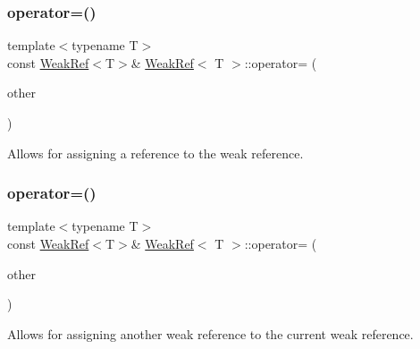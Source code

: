\mbox{\label{class_weak_ref_a1ea1d08432dd8646f6c085fc93477e75}} 
\subsubsection{\texorpdfstring{operator=()}{operator=()}\hspace{0.1cm}{\footnotesize\ttfamily [1/2]}}
{\footnotesize\ttfamily template$<$typename T$>$ \\
const \mbox{\hyperlink{class_weak_ref}{Weak\+Ref}}$<$T$>$\& \mbox{\hyperlink{class_weak_ref}{Weak\+Ref}}$<$ T $>$\+::operator= (\begin{DoxyParamCaption}\item[{const \mbox{\hyperlink{class_ref}{Ref}}$<$ T $>$ \&}]{other }\end{DoxyParamCaption})\hspace{0.3cm}{\ttfamily [inline]}}



Allows for assigning a reference to the weak reference. 

\mbox{\label{class_weak_ref_a647831d0f0c96e484b8fd6c22a8fb648}} 
\subsubsection{\texorpdfstring{operator=()}{operator=()}\hspace{0.1cm}{\footnotesize\ttfamily [2/2]}}
{\footnotesize\ttfamily template$<$typename T$>$ \\
const \mbox{\hyperlink{class_weak_ref}{Weak\+Ref}}$<$T$>$\& \mbox{\hyperlink{class_weak_ref}{Weak\+Ref}}$<$ T $>$\+::operator= (\begin{DoxyParamCaption}\item[{const \mbox{\hyperlink{class_weak_ref}{Weak\+Ref}}$<$ T $>$ \&}]{other }\end{DoxyParamCaption})\hspace{0.3cm}{\ttfamily [inline]}}



Allows for assigning another weak reference to the current weak reference. 

\mbox{\label{class_weak_ref_ad6a1e1a9555c6be16f288432d58cd996}} 

